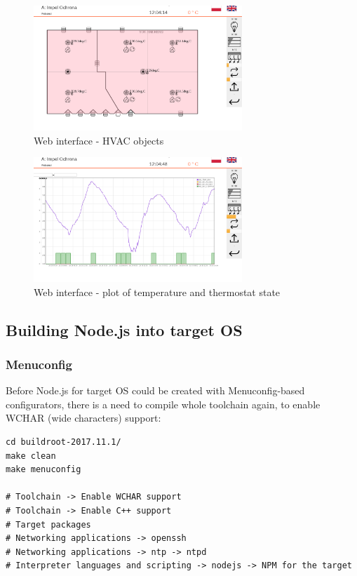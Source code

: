 \documentclass[printmode]{mgr}
\begin{document}
\begin{figure}[htbp]
  \centering
    \includegraphics[width=0.7\textwidth]{5-web.png}
    \caption{Web interface - HVAC objects}
  \label{fig:5-web}
\end{figure}


\begin{figure}[htbp]
  \centering
    \includegraphics[width=0.7\textwidth]{6-web.png}
    \caption{Web interface - plot of temperature and thermostat state}
  \label{fig:6-web}
\end{figure}


\subsection*{Building Node.js into target OS}

\subsubsection{Menuconfig}
Before Node.js for target OS could be created with Menuconfig-based configurators, there is a need to compile whole toolchain again, to enable WCHAR (wide characters) support:

\begin{lstlisting}
cd buildroot-2017.11.1/
make clean
make menuconfig

# Toolchain -> Enable WCHAR support
# Toolchain -> Enable C++ support
# Target packages
# Networking applications -> openssh
# Networking applications -> ntp -> ntpd
# Interpreter languages and scripting -> nodejs -> NPM for the target
\end{lstlisting}
\end{document}
